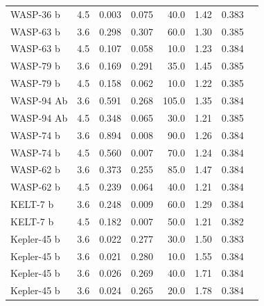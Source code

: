 \begin{subappendices}
{\begin{landscape}
\begin{longtable}[h]{llrrrrrr}
  WASP-36 b   &               4.5 &           0.003 &      0.075 &     40.0 &          1.42 &                0.383 \\
  WASP-63 b   &               3.6 &           0.298 &      0.307 &     60.0 &          1.30 &                0.385 \\
  WASP-63 b   &               4.5 &           0.107 &      0.058 &     10.0 &          1.23 &                0.384 \\
  WASP-79 b   &               3.6 &           0.169 &      0.291 &     35.0 &          1.45 &                0.385 \\
  WASP-79 b   &               4.5 &           0.158 &      0.062 &     10.0 &          1.22 &                0.385 \\
  WASP-94 Ab  &               3.6 &           0.591 &      0.268 &    105.0 &          1.35 &                0.384 \\
  WASP-94 Ab  &               4.5 &           0.348 &      0.065 &     30.0 &          1.21 &                0.385 \\
  WASP-74 b   &               3.6 &           0.894 &      0.008 &     90.0 &          1.26 &                0.384 \\
  WASP-74 b   &               4.5 &           0.560 &      0.007 &     70.0 &          1.24 &                0.384 \\
  WASP-62 b   &               3.6 &           0.373 &      0.255 &     85.0 &          1.47 &                0.384 \\
  WASP-62 b   &               4.5 &           0.239 &      0.064 &     40.0 &          1.21 &                0.384 \\
  KELT-7 b    &               3.6 &           0.248 &      0.009 &     60.0 &          1.29 &                0.384 \\
  KELT-7 b    &               4.5 &           0.182 &      0.007 &     50.0 &          1.21 &                0.382 \\
  Kepler-45 b &               3.6 &           0.022 &      0.277 &     30.0 &          1.50 &                0.383 \\
  Kepler-45 b &               3.6 &           0.021 &      0.280 &     10.0 &          1.55 &                0.384 \\
  Kepler-45 b &               3.6 &           0.026 &      0.269 &     40.0 &          1.71 &                0.384 \\
  Kepler-45 b &               3.6 &           0.024 &      0.265 &     20.0 &          1.78 &                0.384 \\

\end{longtable}
\end{landscape}}
\end{subappendices}
